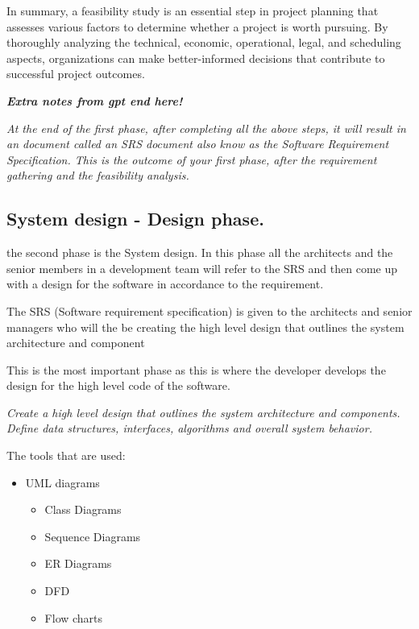 \documentclass[a4paper]{article}
\begin{document}
In summary, a feasibility study is an essential step in project planning that assesses various factors to determine whether 
a project is worth pursuing. By thoroughly analyzing the technical, economic, operational, legal, and scheduling aspects, 
organizations can make better-informed decisions that contribute to successful project outcomes.

\textbf{\textit{Extra notes from gpt end here! }}
\vspace{0.2cm}

\textit{At the end of the first phase, after completing all the above steps, it will result in an document called an SRS document also know as the 
Software Requirement Specification. This is the outcome of your first phase, after the requirement gathering and the feasibility analysis.}

\subsection{System design - Design phase.}
the second phase is the System design.
In this phase all the architects and the senior members in a development team will refer to the SRS and then come up with a design
for the software in accordance to the requirement.  

The SRS (Software requirement specification) is given to the architects and senior managers who will the be creating the high level design that 
outlines the system architecture and component 

This is the most important phase as this is where the developer develops the design for the high level code of the software.  

\textit {Create a high level design that outlines the system architecture and components. Define data structures, interfaces, algorithms and overall
system behavior.}
  
The tools that are used:
\begin{itemize}
    \item UML diagrams
    \begin{itemize}
        \item Class Diagrams
        \item Sequence Diagrams
        \item ER Diagrams
        \item DFD
        \item Flow charts
    \end{itemize}    
\end{itemize}    
\end{document}
